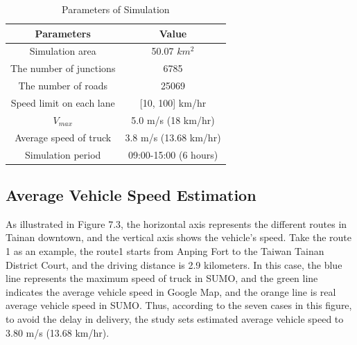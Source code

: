 \documentclass[12pt]{ksthesis}
\begin{document}
\begin{thesis}
{%

\begin{table}
\vspace{0.5cm}
\large
\centering
\caption{\large Parameters of Simulation}

\begin{tabular}{|c|c|} \hline\hline 

\textbf{Parameters}&\textbf{Value}\\ 
\hline  
Simulation area & 50.07 $km^{2}$ \\
\hline
The number of junctions & 6785\\
\hline 
The number of roads & 25069\\
\hline 
Speed limit on each lane & [10, 100] km/hr\\
\hline 
$V_{max}$& 5.0 m/s (18 km/hr) \\
\hline 
Average speed of truck & 3.8 m/s (13.68 km/hr)\\
\hline 
Simulation period & 09:00-15:00 (6 hours)\\

\hline
 
\end{tabular}

\end{table}

\subsection{Average Vehicle Speed Estimation}

As illustrated in Figure 7.3, the horizontal axis represents the different routes in Tainan downtown, and the vertical axis shows the vehicle's speed. Take the route 1 as an example, the route1 starts from Anping Fort to the Taiwan Tainan District Court, and the driving distance is 2.9 kilometers. In this case, the blue line represents the maximum speed of truck in SUMO, and the green line indicates the average vehicle speed in Google Map, and the orange line is real average vehicle speed in SUMO. Thus, according to the seven cases in this figure, to avoid the delay in delivery, the study sets estimated average vehicle speed to 3.80 m/s (13.68 km/hr).


}
\end{thesis}
\end{document}
